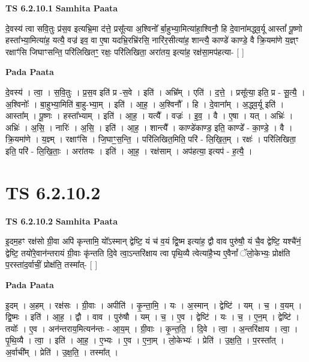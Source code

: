 \documentclass[17pt]{extarticle}
\begin{document}
\textbf{TS 6.2.10.1 } \newline
\textbf{Samhita Paata} \newline

दे॒वस्य॑ त्वा सवि॒तुः प्र॑स॒व इत्यभ्रि॒मा द॑त्ते॒ प्रसू᳚त्या अ॒श्विनो᳚ र्बा॒हुभ्या॒मित्या॑हा॒श्विनौ॒ हि दे॒वाना॑मद्ध्व॒र्यू आस्तां᳚ पू॒ष्णो हस्ता᳚भ्या॒मित्या॑ह॒ यत्यै॒ वज्र॑ इव॒ वा ए॒षा यदभ्रि॒रभ्रि॑रसि॒ नारि॑र॒सीत्या॑ह॒ शान्त्यै॒ काण्डे॑ काण्डे॒ वै क्रि॒यमा॑णे य॒ज्ञ्ꣳ रक्षाꣳ॑सि जिघाꣳसन्ति॒ परि॑लिखितꣳ॒॒ रक्षः॒ परि॑लिखिता॒ अरा॑तय॒ इत्या॑ह॒ रक्ष॑सा॒मप॑हत्या- [  ] \newline

\textbf{Pada Paata} \newline

दे॒वस्य॑ । त्वा॒ । स॒वि॒तुः । प्र॒स॒व इति॑ प्र -स॒वे । इति॑ । अभ्रि᳚म् । एति॑ । द॒त्ते॒ । प्रसू᳚त्या॒ इति॒ प्र - सू॒त्यै॒ । अ॒श्विनोः᳚ । बा॒हुभ्या॒मिति॑ बा॒हु-भ्या॒म् । इति॑ । आ॒ह॒ । अ॒श्विनौ᳚ । हि । दे॒वाना᳚म् । अ॒द्ध्व॒र्यू इति॑ । आस्ता᳚म् । पू॒ष्णः । हस्ता᳚भ्याम् । इति॑ । आ॒ह॒ । यत्यै᳚ । वज्रः॑ । इ॒व॒ । वै । ए॒षा । यत् । अभ्रिः॑ । अभ्रिः॑ । अ॒सि॒ । नारिः॑ । अ॒सि॒ । इति॑ । आ॒ह॒ । शान्त्यै᳚ । काण्डे॑काण्ड॒ इति॒ काण्डे᳚ - का॒ण्डे॒ । वै । क्रि॒यमा॑णे । य॒ज्ञ्म् । रक्षाꣳ॑सि । जि॒घाꣳ॒॒स॒न्ति॒ । परि॑लिखित॒मिति॒ परि॑ - लि॒खि॒त॒म् । रक्षः॑ । परि॑लिखिता॒ इति॒ परि॑ - लि॒खि॒ताः॒ । अरा॑तयः । इति॑ । आ॒ह॒ । रक्ष॑साम् । अप॑हत्या॒ इत्यप॑ - ह॒त्यै॒ ।  \newline




\section*{ TS 6.2.10.2 }

\textbf{TS 6.2.10.2 } \newline
\textbf{Samhita Paata} \newline

इ॒दम॒हꣳ रक्ष॑सो ग्री॒वा अपि॑ कृन्तामि॒ यो᳚ऽस्मान् द्वेष्टि॒ यं च॑ व॒यं द्वि॒ष्म इत्या॑ह॒ द्वौ वाव पुरु॑षौ॒ यं चै॒व द्वेष्टि॒ यश्चै॑नं॒ द्वेष्टि॒ तयो॑रे॒वान॑न्तरायं ग्री॒वाः कृ॑न्तति दि॒वे त्वा॒ऽन्तरि॑क्षाय त्वा पृथि॒व्यै त्वेत्या॑है॒भ्य ए॒वैनां᳚ ॅलो॒केभ्यः॒ प्रोक्ष॑ति प॒रस्ता॑द॒र्वाचीं॒ प्रोक्ष॑ति॒ तस्मा᳚त्- [  ] \newline

\textbf{Pada Paata} \newline

इ॒दम् । अ॒हम् । रक्ष॑सः । ग्री॒वाः । अपीति॑ । कृ॒न्ता॒मि॒ । यः । अ॒स्मान् । द्वेष्टि॑ । यम् । च॒ । व॒यम् । द्वि॒ष्मः । इति॑ । आ॒ह॒ । द्वौ । वाव । पुरु॑षौ । यम् । च॒ । ए॒व । द्वेष्टि॑ । यः । च॒ । ए॒न॒म् । द्वेष्टि॑ । तयोः᳚ । ए॒व । अन॑न्तराय॒मित्यन॑न्तः - आ॒य॒म् । ग्री॒वाः । कृ॒न्त॒ति॒ । दि॒वे । त्वा॒ । अ॒न्तरि॑क्षाय । त्वा॒ । पृ॒थि॒व्यै । त्वा॒ । इति॑ । आ॒ह॒ । ए॒भ्यः । ए॒व । ए॒ना॒म् । लो॒केभ्यः॑ । प्रेति॑ । उ॒क्ष॒ति॒ । प॒रस्ता᳚त् । अ॒र्वाची᳚म् । प्रेति॑ । उ॒क्ष॒ति॒ । तस्मा᳚त् ।  \newline
\end{document}
